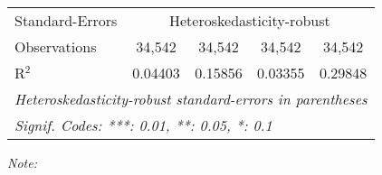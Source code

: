 \begin{table}[htbp!]
\begin{adjustbox}{width = 1\textwidth, max height = 0.95\textheight, center}
\begin{threeparttable}[b]
\begin{tabular}{lcccc}
            \midrule 
            Standard-Errors & \multicolumn{4}{c}{Heteroskedasticity-robust} \\ 
            Observations         & 34,542                         & 34,542                         & 34,542                         & 34,542\\  
            R$^2$                & 0.04403                        & 0.15856                        & 0.03355                        & 0.29848\\  
            \midrule \midrule
            \multicolumn{5}{l}{\emph{Heteroskedasticity-robust standard-errors in parentheses}}\\
            \multicolumn{5}{l}{\emph{Signif. Codes: ***: 0.01, **: 0.05, *: 0.1}}\\
         \end{tabular}
         
         \begin{tablenotes}\item \medskip \textit{Note:}
         \end{tablenotes}
      \end{threeparttable}
   \end{adjustbox}
\end{table}


